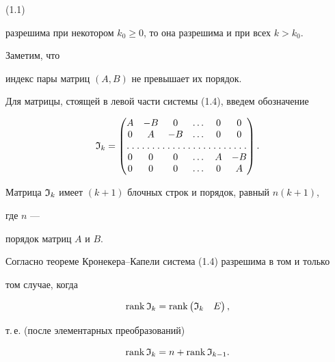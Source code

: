 (1.1) 


разрешима при некотором $k_0\ge0$, то она разрешима и при всех $k>k_0$. 


Заметим, что 


индекс пары матриц $(A,B)$ не превышает их порядок. 


 


Для матрицы, стоящей в левой части системы (1.4), введем обозначение 


$$ 


\frak I_k= 


\begin{pmatrix} 


A & -B & 0 & \dotsc & 0 & 0 \\ 


0 & A & -B & \dotsc & 0 & 0 \\ 


\hdotsfor[1.5]{6} \\


0 & 0 & 0 & \dotsc & A & -B \\ 


0 & 0 & 0 & \dotsc & 0 & A 


\end{pmatrix} 


. 


$$ 





Матрица $\frak I_k$ имеет $(k+1)$ блочных строк и порядок, равный $n(k+1)$, 


где $n$ --- 


порядок матриц $A$ и $B$. 


 


Согласно теореме Кронекера--Капели система (1.4) разрешима в том и только 


том случае, когда 


$$ 


\rank\frak I_k=\rank 


\begin{pmatrix} 


\frak I_k & E 


\end{pmatrix} 


, 


$$ 


т.\,е. (после элементарных преобразований) 


\begin{equation} 


\rank\frak I_k=n+\rank\frak I_{k-1}. 


\end{equation} 


